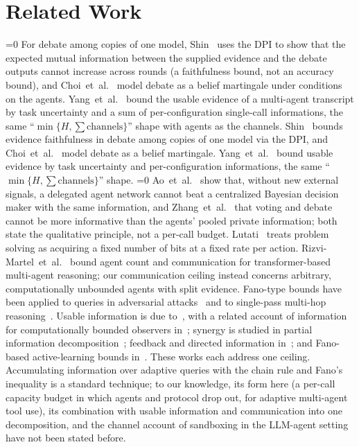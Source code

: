 \documentclass[conference]{IEEEtran}
\providecommand{\PaperShort}{0}  %
\theoremstyle{definition}
\newcommand{\Hh}{H}
\begin{document}
\section{Related Work}

\ifnum\PaperShort=0
For debate among copies of one model, Shin~\cite{shin2026} uses the DPI to show
that the expected mutual information between the supplied evidence and the
debate outputs cannot increase across rounds (a faithfulness bound, not an
accuracy bound), and Choi~et~al.~\cite{choi2025} model debate as a belief
martingale under conditions on the agents. Yang~et~al.~\cite{yang2026} bound
the usable evidence of a multi-agent transcript by task uncertainty and a sum of
per-configuration single-call informations, the same
``$\min\{\Hh,\sum\text{channels}\}$'' shape with agents as the channels.
\else
Shin~\cite{shin2026} bounds evidence faithfulness in debate among copies of
one model via the DPI, and Choi~et~al.~\cite{choi2025} model debate as a belief
martingale. Yang~et~al.~\cite{yang2026} bound usable evidence by task
uncertainty and per-configuration informations, the same
``$\min\{\Hh,\sum\text{channels}\}$'' shape.
\fi
\ifnum\PaperShort=0
Ao~et~al.~\cite{ao2026} show that, without new external signals, a delegated
agent network cannot beat a centralized Bayesian decision maker with the same
information, and Zhang~et~al.~\cite{zhang2026blackwell} that voting and debate
cannot be more informative than the agents' pooled private information; both
state the qualitative principle, not a per-call budget. Lutati~\cite{lutati2025}
treats problem solving as acquiring a fixed number of bits at a fixed rate per
action. Rizvi-Martel~et~al.~\cite{rizvi2026} bound agent count and communication
for transformer-based multi-agent reasoning; our communication ceiling instead
concerns arbitrary, computationally unbounded agents with split evidence.
\fi Fano-type bounds have been applied to queries in adversarial
attacks~\cite{kaneko2025} and to single-pass multi-hop reasoning~\cite{wan2026fano}.
Usable information is due to~\cite{xu2020}, with a related account of information
for computationally bounded observers in~\cite{finzi2026}; synergy is studied in partial
information decomposition~\cite{williams2010}; feedback and directed information
in~\cite{massey1990}; and Fano-based active-learning bounds
in~\cite{raginsky2011}. These works each address one ceiling. Accumulating information over adaptive queries with the chain rule and Fano's
inequality is a standard technique; to our knowledge, its form here (a per-call
capacity budget in which agents and protocol drop out, for adaptive multi-agent
tool use), its combination with usable information and communication into one
decomposition, and the channel account of sandboxing in the LLM-agent setting
have not been stated before.
\end{document}
